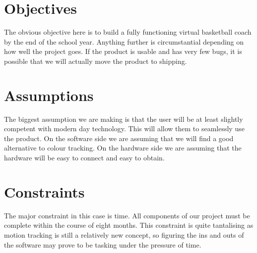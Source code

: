 \documentclass{article}
\begin{document}
\section{Objectives}
The obvious objective here is to build a fully functioning virtual basketball coach by the end of the school year. Anything further is circumstantial depending on how well the project goes. If the product is usable and has very few bugs, it is possible that we will actually move the product to shipping.

\section{Assumptions}
The biggest assumption we are making is that the user will be at least slightly competent with modern day technology. This will allow them to seamlessly use the product. On the software side we are assuming that we will find a good alternative to colour tracking. On the hardware side we are assuming that the hardware will be easy to connect and easy to obtain.

\section{Constraints}
The major constraint in this case is time. All components of our project must be complete within the course of eight months. This constraint is quite tantalising as motion tracking is still a relatively new concept, so figuring the ins and outs of the software may prove to be tasking under the pressure of time.
\end{document}
